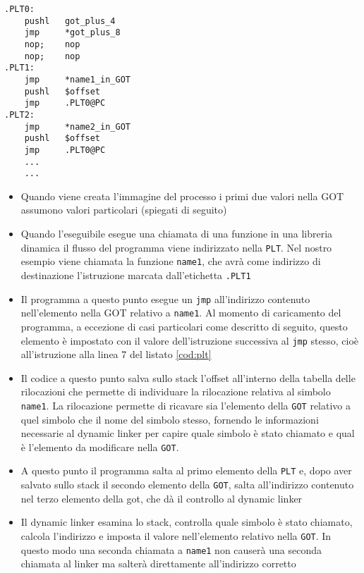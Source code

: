 \begin{lstlisting}[caption=Procedure linkage table, label=cod:plt]
.PLT0:
    pushl   got_plus_4
    jmp     *got_plus_8
    nop;    nop
    nop;    nop
.PLT1:
    jmp     *name1_in_GOT
    pushl   $offset
    jmp     .PLT0@PC
.PLT2:
    jmp     *name2_in_GOT
    pushl   $offset
    jmp     .PLT0@PC
    ...
    ...
\end{lstlisting}

\begin{itemize}
\item Quando viene creata l'immagine del processo i primi due valori
  nella GOT assumono valori particolari (spiegati di seguito)
\item Quando l'eseguibile esegue una chiamata di una funzione in una
  libreria dinamica il flusso del programma viene indirizzato nella
  \lstinline{PLT}. Nel nostro esempio viene chiamata la funzione
  \lstinline{name1}, che avrà come indirizzo di destinazione
  l'istruzione marcata dall'etichetta \lstinline{.PLT1}
\item Il programma a questo punto esegue un \lstinline{jmp}
  all'indirizzo contenuto nell'elemento nella GOT relativo a
  \lstinline{name1}. Al momento di caricamento del programma, a
  eccezione di casi particolari come descritto di seguito, questo
  elemento è impostato con il valore dell'istruzione successiva al
  \lstinline{jmp} stesso, cioè all'istruzione alla linea 7 del listato
  \ref{cod:plt}
\item Il codice a questo punto salva sullo stack l'offset all'interno
  della tabella delle rilocazioni che permette di individuare la
  rilocazione relativa al simbolo \lstinline{name1}. La rilocazione
  permette di ricavare sia l'elemento della \lstinline{GOT} relativo a
  quel simbolo che il nome del simbolo stesso, fornendo le
  informazioni necessarie al dynamic linker per capire quale simbolo è
  stato chiamato e qual è l'elemento da modificare nella
  \lstinline{GOT}.
\item A questo punto il programma salta al primo elemento della
  \lstinline{PLT} e, dopo aver salvato sullo stack il secondo elemento
  della \lstinline{GOT}, salta all'indirizzo contenuto nel terzo
  elemento della got, che dà il controllo al dynamic linker
\item Il dynamic linker esamina lo stack, controlla quale simbolo è
  stato chiamato, calcola l'indirizzo e imposta il valore
  nell'elemento relativo nella \lstinline{GOT}. In questo modo una
  seconda chiamata a \lstinline{name1} non causerà una seconda
  chiamata al linker ma salterà direttamente all'indirizzo corretto
\end{itemize}

